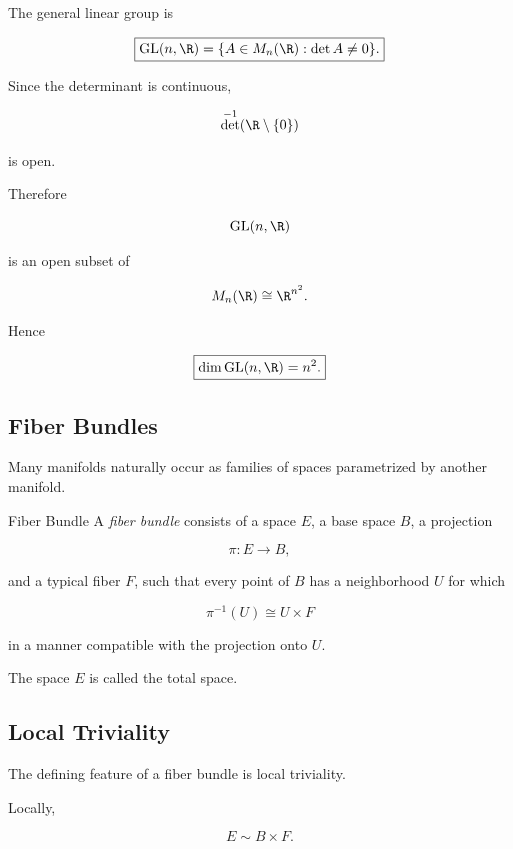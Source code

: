 The general linear group is

\[
\boxed{
\mathrm{GL}(n,\R)
=
\{
A\in M_n(\R):\det A\neq0
\}.
}
\]

Since the determinant is continuous,

\[
\det^{-1}(\R\setminus\{0\})
\]

is open.

Therefore

\[
\mathrm{GL}(n,\R)
\]

is an open subset of

\[
M_n(\R)\cong\R^{n^2}.
\]

Hence

\[
\boxed{
\dim\mathrm{GL}(n,\R)=n^2.
}
\]

\subsection{Fiber Bundles}
\label{subsec:fiber-bundles-manifolds}

Many manifolds naturally occur as families of spaces parametrized by
another manifold.

\begin{definitionbox}{Fiber Bundle}
A \emph{fiber bundle} consists of a space \(E\), a base space \(B\), a
projection

\[
\boxed{
\pi:E\to B,
}
\]

and a typical fiber \(F\), such that every point of \(B\) has a neighborhood
\(U\) for which

\[
\boxed{
\pi^{-1}(U)\cong U\times F
}
\]

in a manner compatible with the projection onto \(U\).
\end{definitionbox}

The space \(E\) is called the total space.

\subsection{Local Triviality}
\label{subsec:local-triviality-bundles}

The defining feature of a fiber bundle is local triviality.

Locally,

\[
\boxed{
E\sim B\times F.
}
\]

